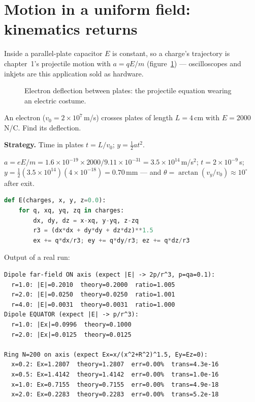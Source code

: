 \section{Motion in a uniform field: kinematics returns}\label{sec:ef-motion}

Inside a parallel-plate capacitor $E$ is constant, so a charge's
trajectory is chapter~1's projectile motion with $a=qE/m$
(figure~\ref{fig:defl}) --- oscilloscopes and inkjets are this
application sold as hardware.

\begin{figure}[htbp]\centering

\caption{Electron deflection between plates: the projectile equation
wearing an electric costume.}
\label{fig:defl}
\end{figure}

\begin{example}\label{ex:deflect}
An electron ($v_0=2\times10^{7}$\,m/s) crosses plates of length
$L=4$\,cm with $E=2000$\,N/C. Find its deflection.
\par\smallskip
\textbf{Strategy.} Time in plates $t=L/v_0$; $y=\tfrac12at^{2}$.
\begin{solution}
$a=eE/m=1.6\times10^{-19}\times2000/9.11\times10^{-31}=3.5\times10^{14}$\,m/s$^{2}$;
$t=2\times10^{-9}$\,s;
$y=\tfrac12(3.5\times10^{14})(4\times10^{-18})=0.70$\,mm ---
and $\theta=\arctan(v_y/v_0)\approx10^{\circ}$ after exit. \checkmark
\end{solution}
\end{example}

\begin{lstlisting}[language=Python,caption={\texttt{code/ch09\_field\_lines.py} --- superposition check: dipole and ring vs theory.},label={lst:field}]
def E(charges, x, y, z=0.0):
    for q, xq, yq, zq in charges:
        dx, dy, dz = x-xq, y-yq, z-zq
        r3 = (dx*dx + dy*dy + dz*dz)**1.5
        ex += q*dx/r3; ey += q*dy/r3; ez += q*dz/r3
\end{lstlisting}

Output of a real run:
\begin{lstlisting}[numbers=none]
Dipole far-field ON axis (expect |E| -> 2p/r^3, p=qa=0.1):
  r=1.0: |E|=0.2010  theory=0.2000  ratio=1.005
  r=2.0: |E|=0.0250  theory=0.0250  ratio=1.001
  r=4.0: |E|=0.0031  theory=0.0031  ratio=1.000
Dipole EQUATOR (expect |E| -> p/r^3):
  r=1.0: |Ex|=0.0996  theory=0.1000
  r=2.0: |Ex|=0.0125  theory=0.0125

Ring N=200 on axis (expect Ex=x/(x^2+R^2)^1.5, Ey=Ez=0):
  x=0.2: Ex=1.2807  theory=1.2807  err=0.00%  trans=4.3e-16
  x=0.5: Ex=1.4142  theory=1.4142  err=0.00%  trans=1.0e-16
  x=1.0: Ex=0.7155  theory=0.7155  err=0.00%  trans=4.9e-18
  x=2.0: Ex=0.2283  theory=0.2283  err=0.00%  trans=5.2e-18
\end{lstlisting}

